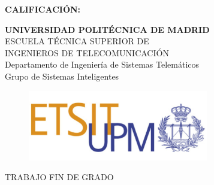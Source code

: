 {\large{\bf CALIFICACIÓN:}}
\pagestyle{empty}
\cleardoublepage
\vspace*{\baselineskip}
\begin{center}
	
	{\LARGE\rm\textbf{UNIVERSIDAD POLITÉCNICA DE MADRID}\\
	    \vspace{1.0cm}
	    ESCUELA TÉCNICA SUPERIOR DE\\ INGENIEROS DE TELECOMUNICACIÓN
	}   \\

	{\Large\rm Departamento de Ingeniería de Sistemas Telemáticos\\
	    Grupo de Sistemas Inteligentes  
	}   \\

    \begin{figure}[!htbp]
	    \centering
        \includegraphics[width=0.7\textwidth]{img/logo_etsit.jpg}
    \end{figure}
    
	\vspace{1.0cm}
	{\LARGE\rm TRABAJO FIN DE GRADO\\
	    \vspace{2.0cm}
        \MakeUppercase{ \textbf{\tfgtitlees} } \\ 
	}
	\vspace{1.0cm}
    \Large\rm\textbf{\authorname}\\ 
    \vspace{1.0cm}
    \fecha
\end{center}  

\cleardoublepage
